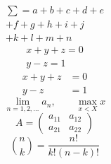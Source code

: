 \documentclass{article}
\begin{document}
\begin{multline}
  \sum = a + b + c + d + e \\
  + f + g + h + i + j \\
  + k + l + m + n
\end{multline}
\begin{gather}
  x + y + z = 0 \\
  y - z = 1
\end{gather}
\begin{align}
  x + y + z & = 0 \\
  y - z     & = 1
\end{align}
\begin{equation}
  \label{root}
  \lim_{n=1, 2, \ldots} a_n, \qquad \max_{x<X} x
\end{equation}
\begin{equation}
  \label{array}
  A = \left(
  \begin{array}{cc}
      a_{11} & a_{12} \\
      a_{21} & a_{22}
    \end{array}
  \right)
\end{equation}
\begin{equation}
  \label{binomial}
  \binom{n}{k} = \frac{n!}{k!(n-k)!}
\end{equation}
\end{document}
